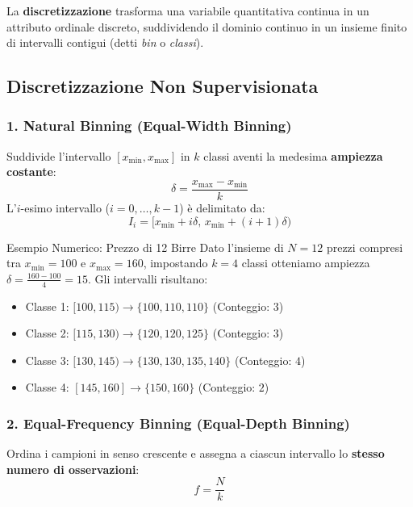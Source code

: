 La \textbf{discretizzazione} trasforma una variabile quantitativa continua in un attributo ordinale discreto, suddividendo il dominio continuo in un insieme finito di intervalli contigui (detti \textit{bin} o \textit{classi}).

\FloatBarrier
\subsection{Discretizzazione Non Supervisionata}

\subsubsection{1. Natural Binning (Equal-Width Binning)}
Suddivide l'intervallo $[x_{\min}, x_{\max}]$ in $k$ classi aventi la medesima \textbf{ampiezza costante}:
\begin{equation}
    \delta = \frac{x_{\max} - x_{\min}}{k}
\end{equation}
L'$i$-esimo intervallo ($i = 0, \dots, k-1$) è delimitato da:
\begin{equation}
    I_i = \big[x_{\min} + i\delta,\, x_{\min} + (i+1)\delta\big)
\end{equation}

\begin{noteblock}{Esempio Numerico: Prezzo di 12 Birre}
Dato l'insieme di $N=12$ prezzi compresi tra $x_{\min}=100$ e $x_{\max}=160$, impostando $k=4$ classi otteniamo ampiezza $\delta = \frac{160-100}{4} = 15$. Gli intervalli risultano:
\begin{itemize}[noitemsep]
    \item Classe 1: $[100, 115) \to \{100, 110, 110\}$ (Conteggio: $3$)
    \item Classe 2: $[115, 130) \to \{120, 120, 125\}$ (Conteggio: $3$)
    \item Classe 3: $[130, 145) \to \{130, 130, 135, 140\}$ (Conteggio: $4$)
    \item Classe 4: $[145, 160] \to \{150, 160\}$ (Conteggio: $2$)
\end{itemize}
\end{noteblock}

\subsubsection{2. Equal-Frequency Binning (Equal-Depth Binning)}
Ordina i campioni in senso crescente e assegna a ciascun intervallo lo \textbf{stesso numero di osservazioni}:
\begin{equation}
    f = \frac{N}{k}
\end{equation}

